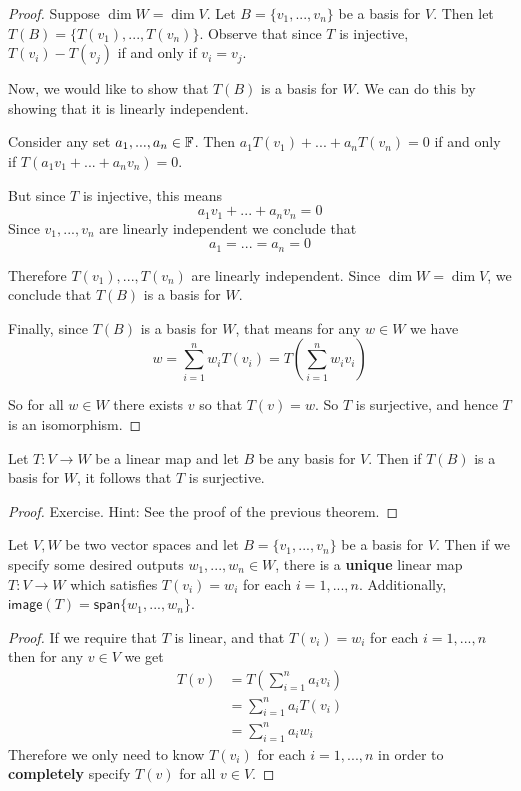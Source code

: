 \begin{proof}
Suppose $\dim W = \dim V$. Let $B=\{v_1,...,v_n\}$ be a basis for $V$. Then let $T(B) = \{T(v_1),...,T(v_n)\}$. Observe that since $T$ is injective, $T(v_i)-T(v_j)$ if and only if $v_i=v_j$. 

Now, we would like to show that $T(B)$ is a basis for $W$. We can do this by showing that it is linearly independent. 

Consider any set $a_1,...,a_n \in \operatorname{\mathbb{F}}$. Then $a_1T(v_1)+...+a_nT(v_n) = 0$ if and only if $T(a_1v_1+...+a_nv_n)=0$. 

But since $T$ is injective, this means
\[a_1v_1+...+a_nv_n=0\]
Since $v_1,...,v_n$ are linearly independent we conclude that \[a_1=...=a_n=0\] 

Therefore $T(v_1),...,T(v_n)$ are linearly independent. Since $\dim W = \dim V$, we conclude that $T(B)$ is a basis for $W$. 

Finally, since $T(B)$ is a basis for $W$, that means for any $w \in W$ we have 
\[w = \sum_{i=1}^n w_i T(v_i) = T\left(\sum_{i=1}^n w_i v_i\right)\] 

So for all $w \in W$ there exists $v$ so that $T(v)=w$. So $T$ is surjective, and hence $T$ is an isomorphism.
\end{proof}

\begin{cor}
    Let $T : V \to W$ be a linear map and let $B$ be any basis for $V$. Then if $T(B)$ is a basis for $W$, it follows that $T$ is surjective.
\end{cor}
\begin{proof}
    Exercise. Hint: See the proof of the previous theorem.
\end{proof}


\begin{thm}
Let $V,W$ be two vector spaces and let $B = \{v_1,...,v_n\}$ be a basis for $V$. Then if we specify some desired outputs $w_1,...,w_n\in W$, there is a \textbf{unique} linear map $T : V \to W$ which satisfies $T(v_i)=w_i$ for each $i=1,...,n$. Additionally, $\textsf{image}(T) = \textsf{span}\{w_1,...,w_n\}$.
\end{thm}
\begin{proof}
If we require that $T$ is linear, and that $T(v_i) = w_i$ for each $i=1,...,n$ then for any $v \in V$ we get
\begin{align*}
    T(v) &= T\left(\sum_{i=1}^n a_i v_i\right)\\
    &= \sum_{i=1}^n a_i T(v_i)\\
    &= \sum_{i=1}^n a_i w_i
\end{align*}
Therefore we only need to know $T(v_i)$ for each $i=1,...,n$ in order to \textbf{completely} specify $T(v)$ for all $v\in V$.
\end{proof}

